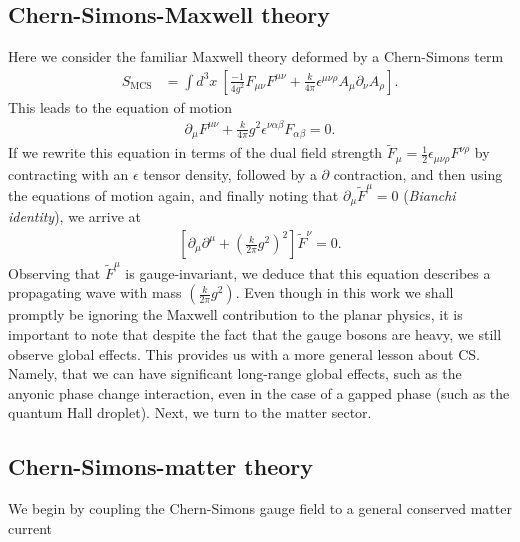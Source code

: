     \subsection{Chern-Simons-Maxwell theory}
    Here we consider the familiar Maxwell theory deformed by a Chern-Simons term
    \begin{align}
        S_{\text{MCS}} &= \int d^3x \ \left[ \frac{-1}{4 g^2} F_{\mu \nu} F^{\mu \nu} + \frac{k}{4 \pi} \epsilon^{\mu \nu \rho} A_{\mu} \partial_{\nu} A_{\rho} \right].
    \end{align}
    This leads to the equation of motion
    \begin{align}
        \partial_{\mu} F^{\mu \nu} + \frac{k}{4\pi} g^2 \epsilon^{\nu \alpha \beta}F_{\alpha \beta} =0.
    \end{align}
    If we rewrite this equation in terms of the dual field strength $\tilde{F}_{\mu} = \frac{1}{2} \epsilon_{\mu\nu\rho} F^{\nu\rho}$ by contracting with an $\epsilon$ tensor density, followed by a $\partial$ contraction, and then using the equations of motion again, and finally noting that $\partial_{\mu} \tilde{F}^{\mu} =0$ (\textit{Bianchi identity}), we arrive at 
    \begin{align}
        \left[\partial_{\mu} \partial^{\mu} + \left(\frac{k}{2 \pi} g^2 \right)^2 \right] \tilde{F}^{\nu}=0.
    \end{align}
    Observing that $\tilde{F}^{\mu}$ is gauge-invariant, we deduce that this equation describes a propagating wave with mass $\left(\frac{k}{2 \pi} g^2 \right)$.
    Even though in this work we shall promptly be ignoring the Maxwell contribution to the planar physics, it is important to note that despite the fact that the gauge bosons are heavy, we still observe global effects. This provides us with a more general lesson about CS. Namely, that we can have significant long-range global effects, such as the anyonic phase change interaction, even in the case of a gapped phase (such as the quantum Hall droplet).
    Next, we turn to the matter sector.
    \subsection{Chern-Simons-matter theory}
    
    We begin by coupling the Chern-Simons gauge field to a general conserved matter current


